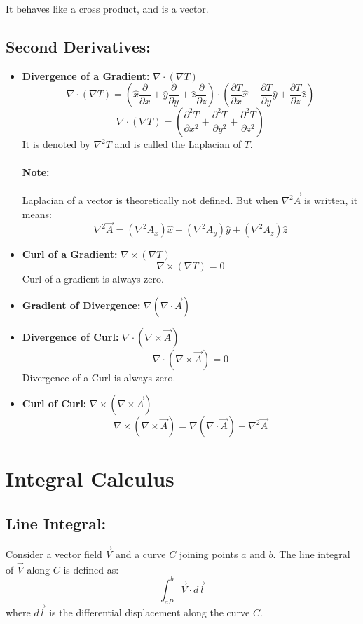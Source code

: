 \documentclass{article}
\begin{document}
It behaves like a cross product, and is a vector.

\subsection{Second Derivatives:}
\begin{itemize}
	\item \textbf{Divergence of a Gradient: } $\nabla \cdot \left(\nabla T\right)$
	      \[ \nabla \cdot \left(\nabla T\right)  = \left(\hat{x} \frac{\partial}{\partial x} + \hat{y} \frac{\partial}{\partial y} + \hat{z} \frac{\partial}{\partial z}\right) \cdot \left(\frac{\partial T}{\partial x} \hat{x} + \frac{\partial T}{\partial y} \hat{y} + \frac{\partial T}{\partial z} \hat{z}\right)\]
	      \[ \nabla \cdot \left(\nabla T\right)  = \left(\frac{\partial^2 T}{\partial x^2} + \frac{\partial^2 T}{\partial y^2} + \frac{\partial^2 T}{\partial z^2}\right)\]
	      It is denoted by $\nabla^2 T$ and is called the Laplacian of $T$.
	      \paragraph*{Note:} Laplacian of a vector is theoretically not defined. But when $\nabla^2 \vec{A}$ is written, it means:
	      \[\nabla^2 \vec{A} = \left(\nabla^2 A_x\right) \hat{x} + \left(\nabla^2 A_y\right) \hat{y} + \left(\nabla^2 A_z\right) \hat{z}\]
	\item \textbf{Curl of a Gradient: } $\nabla \times \left(\nabla T\right)$
	      \[\nabla \times \left(\nabla T\right) = 0\]
	      Curl of a gradient is always zero.
	\item \textbf{Gradient of Divergence: } $\nabla \left(\nabla \cdot \vec{A}\right)$
	\item \textbf{Divergence of Curl: } $\nabla \cdot \left(\nabla \times \vec{A}\right)$
	      \[\nabla \cdot \left(\nabla \times \vec{A}\right) = 0\]
	      Divergence of a Curl is always zero.
	\item \textbf{Curl of Curl: } $\nabla \times \left(\nabla \times \vec{A}\right)$
	      \[\nabla \times \left(\nabla \times \vec{A}\right) = \nabla \left(\nabla \cdot \vec{A}\right) - \nabla^2 \vec{A}\]
\end{itemize}

\section{Integral Calculus}

\subsection{Line Integral: }
Consider a vector field $\vec{V}$ and a curve $C$ joining points $a$ and $b$. The line integral of $\vec{V}$ along $C$ is defined as:
\[\int_{aP}^{b} \vec{V} \cdot d\vec{l}\]
where $d\vec{l}$ is the differential displacement along the curve $C$.
\end{document}

